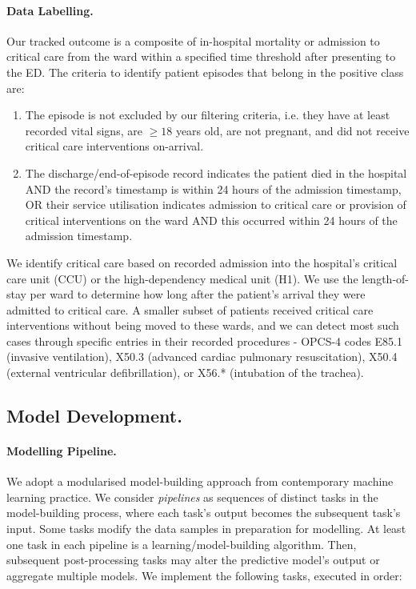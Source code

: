\documentclass[fleqn,10pt]{wlscirep}
\begin{document}
\paragraph{Data Labelling.} Our tracked outcome is a composite of in-hospital mortality or admission to critical care from the ward within a specified time threshold after presenting to the ED. The criteria to identify patient episodes that belong in the positive class are:
\begin{enumerate}
    \item The episode is not excluded by our filtering criteria, i.e. they have at least recorded vital signs, are $\geq 18$ years old, are not pregnant, and did not receive critical care interventions on-arrival.
    \item The discharge/end-of-episode record indicates the patient died in the hospital AND the record's timestamp is within 24 hours of the admission timestamp, OR their service utilisation indicates admission to critical care or provision of critical interventions on the ward AND this occurred within 24 hours of the admission timestamp.
\end{enumerate}
We identify critical care based on recorded admission into the hospital's critical care unit (CCU) or the high-dependency medical unit (H1). We use the length-of-stay per ward to determine how long after the patient's arrival they were admitted to critical care. A smaller subset of patients received critical care interventions without being moved to these wards, and we can detect most such cases through specific entries in their recorded procedures - OPCS-4 codes E85.1 (invasive ventilation), X50.3 (advanced cardiac pulmonary resuscitation), X50.4 (external ventricular defibrillation), or X56.* (intubation of the trachea).

\subsection*{Model Development.}
\paragraph{Modelling Pipeline.} We adopt a modularised model-building approach from contemporary machine learning practice. We consider \emph{pipelines} as sequences of distinct tasks in the model-building process, where each task's output becomes the subsequent task's input. Some tasks modify the data samples in preparation for modelling. At least one task in each pipeline is a learning/model-building algorithm. Then, subsequent post-processing tasks may alter the predictive model's output or aggregate multiple models. We implement the following tasks, executed in order:
\end{document}
